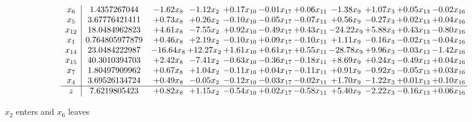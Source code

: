 \documentclass[9pt]{article}
\begin{document}
 \[\begin{array}{c| c c@{\hskip 2pt} c@{\hskip 2pt} c@{\hskip 2pt} c@{\hskip 2pt} c@{\hskip 2pt} c@{\hskip 2pt} c@{\hskip 2pt} c@{\hskip 2pt} c@{\hskip 2pt} }
 x_{6}   &  1.4357267044 & -1.62 x_{8} & -1.12 x_{2} & +  0.17 x_{10} & -0.01 x_{17} & +  0.06 x_{11} & -1.38 x_{9} & +  1.07 x_{3} & +  0.05 x_{13} & -0.02 x_{16}\\
 x_{5}   &  3.67776421411 & +  0.73 x_{8} & +  0.26 x_{2} & -0.10 x_{10} & -0.05 x_{17} & -0.07 x_{11} & +  0.56 x_{9} & -0.27 x_{3} & +  0.02 x_{13} & +  0.04 x_{16}\\
 x_{12}   &  18.0484962823 & +  4.61 x_{8} & -7.55 x_{2} & +  0.92 x_{10} & -0.49 x_{17} & +  0.43 x_{11} & -24.22 x_{9} & +  5.88 x_{3} & +  0.43 x_{13} & -0.80 x_{16}\\
 x_{1}   &  0.764805977879 & +  0.46 x_{8} & +  2.19 x_{2} & -0.10 x_{10} & +  0.09 x_{17} & -0.10 x_{11} & +  1.11 x_{9} & -0.16 x_{3} & -0.02 x_{13} & -0.04 x_{16}\\
 x_{14}   &  23.0484222987 & -16.64 x_{8} & + 12.27 x_{2} & +  1.61 x_{10} & +  0.61 x_{17} & +  0.55 x_{11} & -28.78 x_{9} & +  9.96 x_{3} & -0.03 x_{13} & -1.42 x_{16}\\
 x_{15}   &  40.3010394703 & +  2.42 x_{8} & -7.41 x_{2} & -0.63 x_{10} & -0.36 x_{17} & -0.18 x_{11} & +  8.69 x_{9} & +  0.24 x_{3} & -0.49 x_{13} & +  0.04 x_{16}\\
 x_{7}   &  1.80497909962 & +  0.67 x_{8} & +  1.04 x_{2} & -0.11 x_{10} & +  0.04 x_{17} & -0.11 x_{11} & +  0.91 x_{9} & -0.92 x_{3} & -0.05 x_{13} & +  0.03 x_{16}\\
 x_{4}   &  3.69526134724 & +  0.49 x_{8} & -0.05 x_{2} & -0.12 x_{10} & -0.03 x_{17} & -0.02 x_{11} & +  1.70 x_{9} & -1.22 x_{3} & +  0.01 x_{13} & +  0.10 x_{16}\\
\hline
z    &  7.6219805423 & +  0.82 x_{8} & +  1.15 x_{2} & -0.54 x_{10} & +  0.02 x_{17} & -0.58 x_{11} & +  5.40 x_{9} & -2.22 x_{3} & -0.16 x_{13} & +  0.06 x_{16}\\
\end{array}\]


 $ x_{2} $ enters and $ x_{6} $ leaves 
\end{document}
